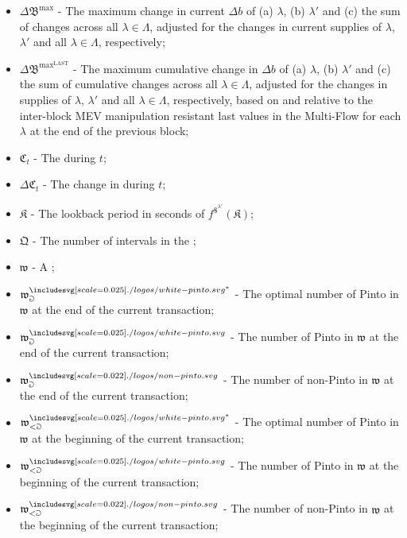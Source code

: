 \documentclass[class=article, crop=false]{standalone}
\begin{document}
\begin{itemize}[topsep=0pt, itemsep=3pt,leftmargin=16pt]

    \item[] $\Delta \mathfrak{B}^\text{max}$ - The maximum change in current $\Delta b$ of (a) $\lambda$, (b) $\lambda'$ and (c) the sum of changes across all $\lambda \in \Lambda$, adjusted for the changes in current supplies of $\lambda$, $\lambda'$ and all $\lambda \in \Lambda$, respectively;
    \item[] $\Delta \mathfrak{B}^{\text{max}^{\text{LAST}}}$ - The maximum cumulative change in $\Delta b$ of (a) $\lambda$, (b) $\lambda'$ and (c) the sum of cumulative changes across all $\lambda \in \Lambda$, adjusted for the changes in supplies of $\lambda$, $\lambda'$ and all $\lambda \in \Lambda$, respectively, based on and relative to the inter-block MEV manipulation resistant last values in the Multi-Flow  for each $\lambda$ at the end of the previous block;
    \item[] $\mathfrak{C}_{t}$ - The  during $t$;
    \item[] $\Delta \mathfrak{C}_{t}$ - The change in  during $t$;
    \item[] $\mathfrak{K}$ - The lookback period in seconds of $f^{\$^{\lambda'}}(\mathfrak{K})$;
    \item[] $\mathfrak{Q}$ - The number of intervals in the ;
    \item[] $\mathfrak{w}$ - A ;
    \item[] $\mathfrak{w}_{\Game}^{\pinto^{*}}$ - The optimal number of Pinto in $\mathfrak{w}$ at the end of the current transaction;
    \item[] $\mathfrak{w}_{\Game}^{\pinto}$ - The number of Pinto in $\mathfrak{w}$ at the end of the current transaction;
    \item[] $\mathfrak{w}_{\Game}^{\nonpinto}$ - The number of non-Pinto in $\mathfrak{w}$ at the end of the current transaction;
    \item[] $\mathfrak{w}_{<\Game}^{\pinto^{*}}$ - The optimal number of Pinto in $\mathfrak{w}$ at the beginning of the current transaction; 
    \item[] $\mathfrak{w}_{<\Game}^{\pinto}$ - The number of Pinto in $\mathfrak{w}$ at the beginning of the current transaction; 
    \item[] $\mathfrak{w}_{<\Game}^{\nonpinto}$ - The number of non-Pinto in $\mathfrak{w}$ at the beginning of the current transaction;

\end{itemize}
\end{document}
